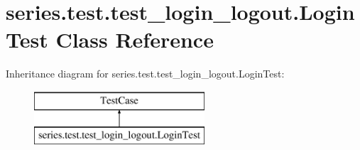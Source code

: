 \hypertarget{classseries_1_1test_1_1test__login__logout_1_1_login_test}{}\section{series.\+test.\+test\+\_\+login\+\_\+logout.\+Login\+Test Class Reference}
\label{classseries_1_1test_1_1test__login__logout_1_1_login_test}
Inheritance diagram for series.\+test.\+test\+\_\+login\+\_\+logout.\+Login\+Test\+:\begin{figure}[H]
\begin{center}
\leavevmode
\includegraphics[height=2.000000cm]{classseries_1_1test_1_1test__login__logout_1_1_login_test}
\end{center}
\end{figure}
